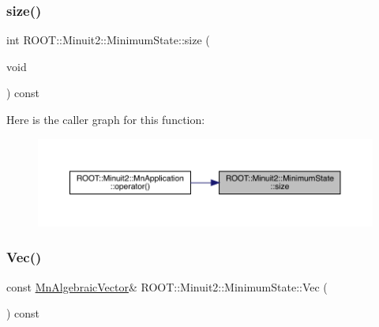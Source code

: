 \mbox{\label{classROOT_1_1Minuit2_1_1MinimumState_af680928a4485a4d0db0c81a8283d24bd}} 
\subsubsection{\texorpdfstring{size()}{size()}\hspace{0.1cm}{\footnotesize\ttfamily [3/3]}}
{\footnotesize\ttfamily int R\+O\+O\+T\+::\+Minuit2\+::\+Minimum\+State\+::size (\begin{DoxyParamCaption}\item[{void}]{ }\end{DoxyParamCaption}) const\hspace{0.3cm}{\ttfamily [inline]}}

Here is the caller graph for this function\+:
\nopagebreak
\begin{figure}[H]
\begin{center}
\leavevmode
\includegraphics[width=350pt]{db/dcd/classROOT_1_1Minuit2_1_1MinimumState_af680928a4485a4d0db0c81a8283d24bd_icgraph}
\end{center}
\end{figure}
\mbox{\label{classROOT_1_1Minuit2_1_1MinimumState_a0c7ad9c9226473f87b1bbb15ed87bbcd}} 
\subsubsection{\texorpdfstring{Vec()}{Vec()}\hspace{0.1cm}{\footnotesize\ttfamily [1/3]}}
{\footnotesize\ttfamily const \mbox{\hyperlink{namespaceROOT_1_1Minuit2_a62ed97730a1ca8d3fbaec64a19aa11c9}{Mn\+Algebraic\+Vector}}\& R\+O\+O\+T\+::\+Minuit2\+::\+Minimum\+State\+::\+Vec (\begin{DoxyParamCaption}{ }\end{DoxyParamCaption}) const\hspace{0.3cm}{\ttfamily [inline]}}

